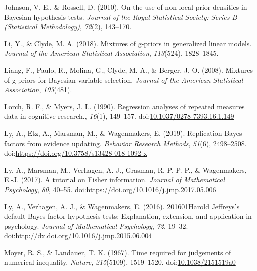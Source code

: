 \documentclass[english,,doc,floatsintext]{apa6}
\begin{document}
\leavevmode\hypertarget{ref-johnson2010use}{}%
Johnson, V. E., \& Rossell, D. (2010). On the use of non-local prior densities in Bayesian hypothesis tests. \emph{Journal of the Royal Statistical Society: Series B (Statistical Methodology)}, \emph{72}(2), 143--170.

\leavevmode\hypertarget{ref-li2018mixtures}{}%
Li, Y., \& Clyde, M. A. (2018). Mixtures of g-priors in generalized linear models. \emph{Journal of the American Statistical Association}, \emph{113}(524), 1828--1845.

\leavevmode\hypertarget{ref-liang2008mixtures}{}%
Liang, F., Paulo, R., Molina, G., Clyde, M. A., \& Berger, J. O. (2008). Mixtures of g priors for Bayesian variable selection. \emph{Journal of the American Statistical Association}, \emph{103}(481).

\leavevmode\hypertarget{ref-lorch1990}{}%
Lorch, R. F., \& Myers, J. L. (1990). Regression analyses of repeated measures data in cognitive research., \emph{16}(1), 149--157. doi:\href{https://doi.org/10.1037/0278-7393.16.1.149}{10.1037/0278-7393.16.1.149}

\leavevmode\hypertarget{ref-ly2017replication}{}%
Ly, A., Etz, A., Marsman, M., \& Wagenmakers, E. (2019). Replication Bayes factors from evidence updating. \emph{Behavior Research Methods}, \emph{51}(6), 2498--2508. doi:\href{https://doi.org/https://doi.org/10.3758/s13428-018-1092-x}{https://doi.org/10.3758/s13428-018-1092-x}

\leavevmode\hypertarget{ref-ly2017tutorial}{}%
Ly, A., Marsman, M., Verhagen, A. J., Grasman, R. P. P. P., \& Wagenmakers, E.-J. (2017). A tutorial on Fisher information. \emph{Journal of Mathematical Psychology}, \emph{80}, 40--55. doi:\href{https://doi.org/https://doi.org/10.1016/j.jmp.2017.05.006}{https://doi.org/10.1016/j.jmp.2017.05.006}

\leavevmode\hypertarget{ref-ly2016harold}{}%
Ly, A., Verhagen, A. J., \& Wagenmakers, E. (2016). 201601Harold Jeffreys's default Bayes factor hypothesis tests: Explanation, extension, and application in psychology. \emph{Journal of Mathematical Psychology}, \emph{72}, 19--32. doi:\href{https://doi.org/http://dx.doi.org/10.1016/j.jmp.2015.06.004}{http://dx.doi.org/10.1016/j.jmp.2015.06.004}

\leavevmode\hypertarget{ref-moyer1967}{}%
Moyer, R. S., \& Landauer, T. K. (1967). Time required for judgements of numerical inequality. \emph{Nature}, \emph{215}(5109), 1519--1520. doi:\href{https://doi.org/10.1038/2151519a0}{10.1038/2151519a0}
\end{document}
